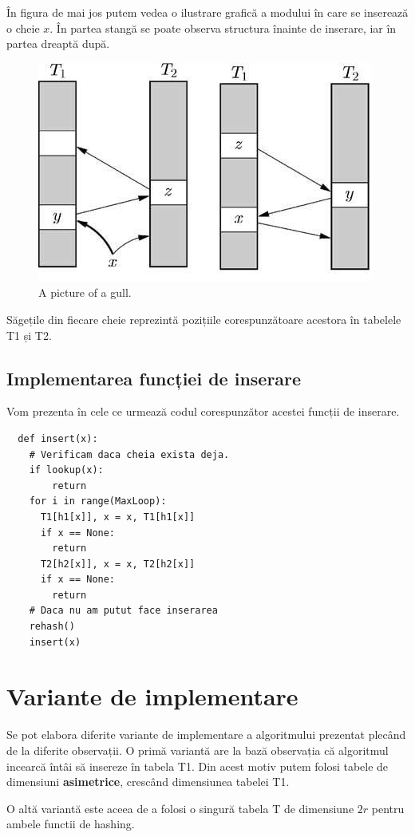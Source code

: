 \documentclass[a4paper]{article}
\theoremstyle{remark}
\theoremstyle{definition}
\begin{document}
În figura de mai jos putem vedea o ilustrare grafică a modului în care se inserează o cheie $x$. În partea stangă se poate observa structura înainte de inserare, iar în partea dreaptă după.

\begin{figure}[h]
\begin{center}
\includegraphics[width=0.4\linewidth]{cuckoo.jpg}
\end{center}
\caption{A picture of a gull.}
\centering
\end{figure}

Săgețile din fiecare cheie reprezintă pozițiile corespunzătoare acestora în tabelele T1 și T2. 

\subsection{Implementarea funcției de inserare}

Vom prezenta în cele ce urmează codul corespunzător acestei funcții de inserare.

\begin{verbatim}
  def insert(x):
  	# Verificam daca cheia exista deja.
  	if lookup(x):
  		return
   	for i in range(MaxLoop):
   	  T1[h1[x]], x = x, T1[h1[x]]
   	  if x == None:
   	    return
   	  T2[h2[x]], x = x, T2[h2[x]]
   	  if x == None:
   	    return
   	# Daca nu am putut face inserarea
   	rehash()
   	insert(x)
\end{verbatim}

\section{Variante de implementare}

Se pot elabora diferite variante de implementare a algoritmului prezentat plecând de la diferite observații. O primă variantă are la bază observația că algoritmul incearcă întâi să insereze în tabela T1. Din acest motiv putem folosi tabele de dimensiuni \textbf{asimetrice}, crescând dimensiunea tabelei T1.

O altă variantă este aceea de a folosi o singură tabela T de dimensiune $2r$ pentru ambele functii de hashing.
\end{document}
